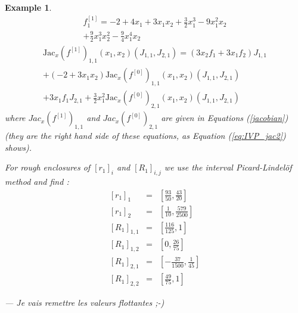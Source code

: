 \documentclass{sig-alternate-05-2015} %
\newcommand\ForAuthors[1]%
 {\par\smallskip                     %
  \begin{center}%
   \fbox%
   {\parbox{0.9\linewidth}%
    {\raggedright\sc--- #1}%
   }%
  \end{center}%
  \par\smallskip                     %
 }
\newtheorem{example}{Example}
\def\int#1{\mbox{$[ #1 ]$}}
\begin{document}
\begin{example}
\begin{multline}
{f}_1^{[1]} = -2+4x_1+3x_1x_2+\frac{3}{2}x_1^3-9x_1^2x_2\\
+\frac{9}{2}x_1^3x_2^2-\frac{9}{4}x_1^4x_2
\end{multline}
\begin{multline}
\mbox{Jac}_x(f^{[1]})_{1,1}(x_1,x_2)(J_{1,1},J_{2,1}) = (3x_2f_1+3x_1f_2)J_{1,1}\\
+(-2+3x_1x_2)\mbox{Jac}_x(f^{[0]})_{1,1}(x_1,x_2)(J_{1,1},J_{2,1}) \\ 
+3x_1f_1J_{2,1}+\frac{3}{2}x_1^2{\mbox{Jac}_x(f^{[0]})}_{2,1}(x_1,x_2)(J_{1,1},J_{2,1}) 
\label{secondderivative}
\end{multline} %
\noindent where $Jac_x(f^{[1]})_{1,1}$ %
and ${Jac_x(f^{[0]})}_{2,1}$ %
are given in Equations (\ref{jacobian}) (they are the right hand side
of these equations, as Equation (\ref{eq:IVP_jac2}) shows). 

For rough enclosures of $\int{r_1}_i$ and $\int{R_1}_{i,j}$ we use the interval Picard-Lindel\"of method and find : 
\begin{eqnarray}%
\int{r_1}_1 & = & \left[\frac{93}{50}, \frac{43}{20}\right]\\
\int{r_1}_2 & = & \left[\frac{1}{10}, \frac{579}{2500}\right]\\
\int{R_1}_{1,1} & = & \left[\frac{116}{125}, 1\right]\\
\int{R_1}_{1,2} & = & \left[0, \frac{26}{75}\right]\\
\int{R_1}_{2,1} & = & \left[-\frac{37}{1500}, \frac{1}{45}\right]\\
\int{R_1}_{2,2} & = & \left[\frac{49}{75}, 1\right]
\label{roughenclosures}
\end{eqnarray}%
\ForAuthors{Je vais remettre les valeurs flottantes ;-)}
\end{example}
\end{document}
